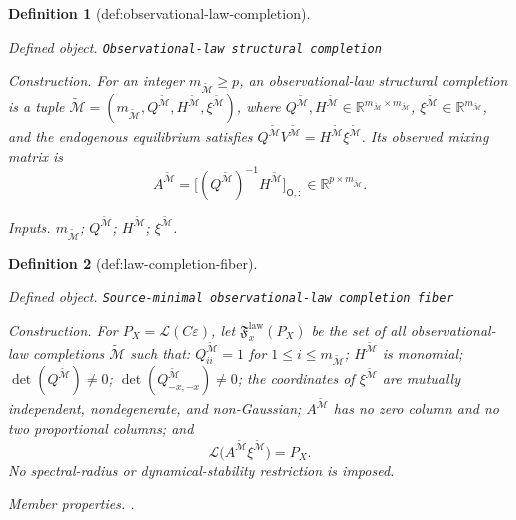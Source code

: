 \documentclass{article}
\newtheorem{definition}{Definition}
\begin{document}
\begin{definition}[def:observational-law-completion]\label{def:observational-law-completion}
\par\smallskip\noindent\emph{Defined object.} \texttt{Observational-\allowbreak{}law structural completion}
\par\smallskip\noindent\emph{Construction.} For an integer \(m_{\widetilde{\mathcal M}}\ge p\), an observational-law structural completion is a tuple \(\widetilde{\mathcal M}=(m_{\widetilde{\mathcal M}},Q^{\widetilde{\mathcal M}},H^{\widetilde{\mathcal M}},\xi^{\widetilde{\mathcal M}})\), where \(Q^{\widetilde{\mathcal M}},H^{\widetilde{\mathcal M}}\in\mathbb R^{m_{\widetilde{\mathcal M}}\times m_{\widetilde{\mathcal M}}}\), \(\xi^{\widetilde{\mathcal M}}\in\mathbb R^{m_{\widetilde{\mathcal M}}}\), and the endogenous equilibrium satisfies \(Q^{\widetilde{\mathcal M}}V^{\widetilde{\mathcal M}}=H^{\widetilde{\mathcal M}}\xi^{\widetilde{\mathcal M}}\). Its observed mixing matrix is
\[
 A^{\widetilde{\mathcal M}}
 =\bigl[(Q^{\widetilde{\mathcal M}})^{-1}H^{\widetilde{\mathcal M}}\bigr]_{\mathsf O,:}
 \in\mathbb R^{p\times m_{\widetilde{\mathcal M}}}.
\]
\par\smallskip\noindent\emph{Inputs.} \(m_{\widetilde{\mathcal M}}\); \(Q^{\widetilde{\mathcal M}}\); \(H^{\widetilde{\mathcal M}}\); \(\xi^{\widetilde{\mathcal M}}\).
\end{definition}

\begin{definition}[def:law-completion-fiber]\label{def:law-completion-fiber}
\par\smallskip\noindent\emph{Defined object.} \texttt{Source-\allowbreak{}minimal observational-\allowbreak{}law completion fiber}
\par\smallskip\noindent\emph{Construction.} For \(P_X=\mathcal L(C\varepsilon)\), let \(\mathfrak F_x^{\mathrm{law}}(P_X)\) be the set of all observational-law completions \(\widetilde{\mathcal M}\) such that: \(Q^{\widetilde{\mathcal M}}_{ii}=1\) for \(1\le i\le m_{\widetilde{\mathcal M}}\); \(H^{\widetilde{\mathcal M}}\) is monomial; \(\det(Q^{\widetilde{\mathcal M}})\ne0\); \(\det(Q^{\widetilde{\mathcal M}}_{-x,-x})\ne0\); the coordinates of \(\xi^{\widetilde{\mathcal M}}\) are mutually independent, nondegenerate, and non-Gaussian; \(A^{\widetilde{\mathcal M}}\) has no zero column and no two proportional columns; and
\[
 \mathcal L\bigl(A^{\widetilde{\mathcal M}}\xi^{\widetilde{\mathcal M}}\bigr)=P_X.
\]
No spectral-radius or dynamical-stability restriction is imposed.
\par\smallskip\noindent\emph{Member properties.} .
\end{definition}
\end{document}
